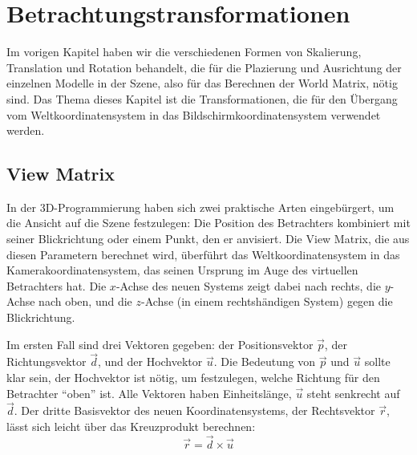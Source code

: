 \chapter{Betrachtungstransformationen}
\label{viewingtransformations}
Im vorigen Kapitel haben wir die verschiedenen Formen von Skalierung, Translation und Rotation behandelt, die für die Plazierung und Ausrichtung der einzelnen Modelle in der Szene, also für das Berechnen der World Matrix, nötig sind. Das Thema dieses Kapitel ist die Transformationen, die für den Übergang vom Weltkoordinatensystem in das Bildschirmkoordinatensystem verwendet werden.

\section{View Matrix}
\label{view}
In der 3D-Programmierung haben sich zwei praktische Arten eingebürgert, um die Ansicht auf die Szene festzulegen: Die Position des Betrachters kombiniert mit seiner Blickrichtung oder einem Punkt, den er anvisiert. Die View Matrix, die aus diesen Parametern berechnet wird, überführt das Weltkoordinatensystem in das Kamerakoordinatensystem, das seinen Ursprung im Auge des virtuellen Betrachters hat. Die $x$-Achse des neuen Systems zeigt dabei nach rechts, die $y$-Achse nach oben, und die $z$-Achse (in einem rechtshändigen System) gegen die Blickrichtung.

Im ersten Fall sind drei Vektoren gegeben: der Positionsvektor $\vec p$, der Richtungsvektor $\vec d$, und der Hochvektor $\vec u$. Die Bedeutung von $\vec p$ und $\vec u$ sollte klar sein, der Hochvektor ist nötig, um festzulegen, welche Richtung für den Betrachter \enquote{oben} ist. Alle Vektoren haben Einheitslänge, $\vec u$ steht senkrecht auf $\vec d$. Der dritte Basisvektor des neuen Koordinatensystems, der Rechtsvektor $\vec r$, lässt sich leicht über das Kreuzprodukt berechnen:
\begin{equation}
 \vec r = \vec d \times \vec u
\end{equation}

